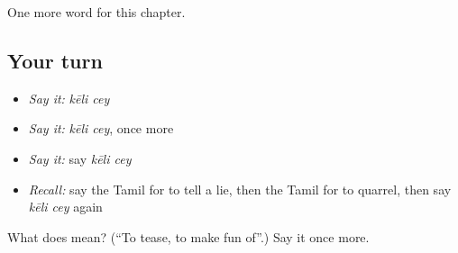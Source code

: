 \begin{grammarlens}[title={What you've built}]
One more word for this chapter.
\end{grammarlens}

\subsection*{Your turn}
\begin{itemize}
\raggedright
  \item \emph{Say it:} \emph{kēli cey}
  \item \emph{Say it:} \emph{kēli cey}, once more
  \item \emph{Say it:} say \emph{kēli cey}
  \item \emph{Recall:} say the Tamil for to tell a lie, then the Tamil for to quarrel, then say \emph{kēli cey} again
\end{itemize}

\begin{tcolorbox}[breakable,colback=teal!4,colframe=teal!35!black,title={Before you move on}]
What does   mean? (\textquotedblleft{}To tease, to make fun of\textquotedblright{}.) Say it once more.
\end{tcolorbox}
